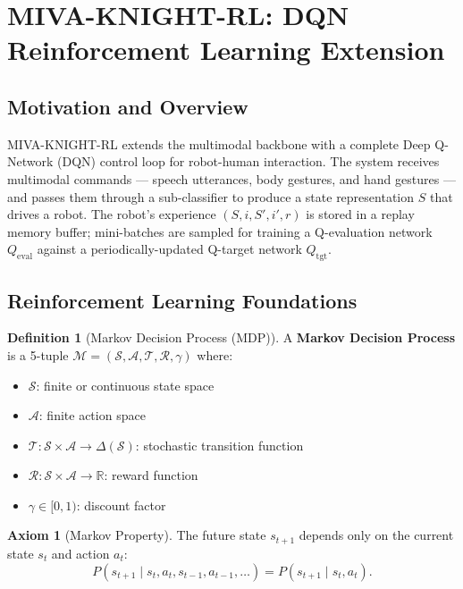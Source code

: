 \documentclass[12pt,a4paper]{article}
\theoremstyle{definition}
\newtheorem{definition}{Definition}[section]
\newtheorem{axiom}{Axiom}[section]
\theoremstyle{plain}
\theoremstyle{remark}
\newcommand{\R}{\mathbb{R}}
\newcommand{\Qeval}{Q_{\text{eval}}}
\newcommand{\Qtgt}{Q_{\text{tgt}}}
\begin{document}
\newpage
\section{MIVA-KNIGHT-RL: DQN Reinforcement Learning Extension}
\label{sec:rl}

\subsection{Motivation and Overview}

MIVA-KNIGHT-RL extends the multimodal backbone with a complete Deep Q-Network (DQN) control loop for robot-human interaction. The system receives multimodal commands — speech utterances, body gestures, and hand gestures — and passes them through a sub-classifier to produce a state representation $S$ that drives a robot. The robot's experience $(S, i, S', i', r)$ is stored in a replay memory buffer; mini-batches are sampled for training a Q-evaluation network $\Qeval$ against a periodically-updated Q-target network $\Qtgt$.

\subsection{Reinforcement Learning Foundations}

\begin{definition}[Markov Decision Process (MDP)]
A \textbf{Markov Decision Process} is a 5-tuple $\mathcal{M} = (\mathcal{S}, \mathcal{A}, \mathcal{T}, \mathcal{R}, \gamma)$ where:
\begin{itemize}[nosep]
  \item $\mathcal{S}$: finite or continuous state space
  \item $\mathcal{A}$: finite action space
  \item $\mathcal{T} : \mathcal{S} \times \mathcal{A} \to \Delta(\mathcal{S})$: stochastic transition function
  \item $\mathcal{R} : \mathcal{S} \times \mathcal{A} \to \R$: reward function
  \item $\gamma \in [0,1)$: discount factor
\end{itemize}
\end{definition}

\begin{axiom}[Markov Property]
The future state $s_{t+1}$ depends only on the current state $s_t$ and action $a_t$:
\[
  P(s_{t+1} \mid s_t, a_t, s_{t-1}, a_{t-1}, \ldots) = P(s_{t+1} \mid s_t, a_t).
\]
\end{axiom}
\end{document}
